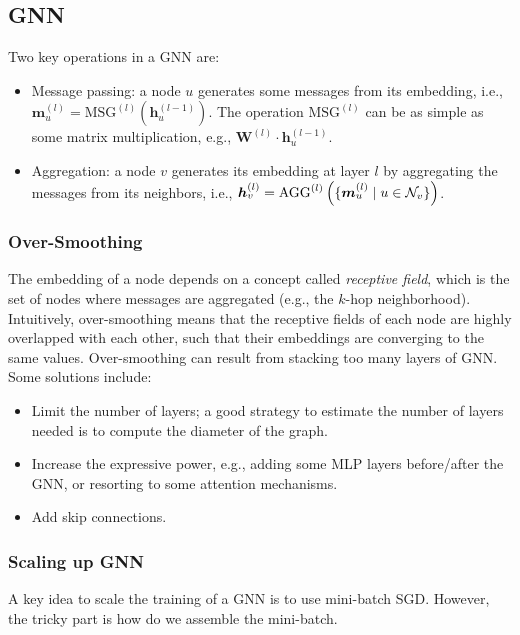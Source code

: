     
    
    \subsection{GNN}
        Two key operations in a GNN are:
        \begin{itemize}
            \item Message passing: a node $u$ generates some messages from its embedding, i.e., $\bm{m}_u^{(l)} = \text{MSG}^{(l)}(\bm{h}_u^{(l-1)})$. The operation $\text{MSG}^{(l)}$ can be as simple as some matrix multiplication, e.g., $\bm{W}^{(l)} \cdot \bm{h}^{(l-1)}_u$.
            \item Aggregation: a node $v$ generates its embedding at layer $l$ by aggregating the messages from its neighbors, i.e., $\bm{h}_v^{(l)} = \text{AGG}^{(l)}\left( \{ \bm{m}_u^{(l)}  \mid u \in \mathcal{N}_v \} \right)$.
        \end{itemize}
        
        \subsubsection{Over-Smoothing}
        The embedding of a node depends on a concept called \emph{receptive field}, which is the set of nodes where messages are aggregated (e.g., the $k$-hop neighborhood).
        Intuitively, over-smoothing means that the receptive fields of each node are highly overlapped with each other, such that their embeddings are converging to the same values.
        Over-smoothing can result from stacking too many layers of GNN.
        Some solutions include:
            \begin{itemize}
                \item Limit the number of layers; a good strategy to estimate the number of layers needed is to compute the diameter of the graph.
                \item Increase the expressive power, e.g., adding some MLP layers before/after the GNN, or resorting to some attention mechanisms.
                \item Add skip connections.
            \end{itemize}
        
        \subsubsection{Scaling up GNN}
            A key idea to scale the training of a GNN is to use mini-batch SGD.
            However, the tricky part is how do we assemble the mini-batch.
            

